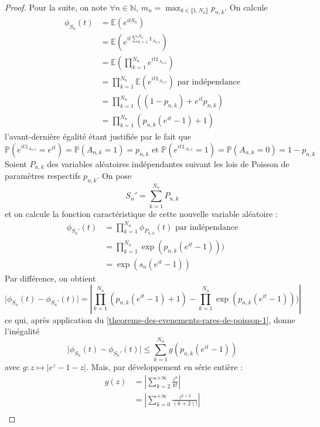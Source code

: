   \begin{proof}
    Pour la suite, on note $\forall n \in \mathbb{N}, \, m_n = \max_{k \in \llbracket 1, N_n \rrbracket} p_{n,k}$. On calcule
    \begin{align*}
      \phi_{S_n}(t) &= \mathbb{E} \left(e^{itS_n} \right) \\
      &= \mathbb{E} \left(e^{it \sum_{k=1}^{N_n} \mathbb{1}_{A_{n,k}}} \right) \\
      &= \mathbb{E} \left(\prod_{k=1}^{N_n} e^{it \mathbb{1}_{A_{n,k}}} \right) \\
      &= \prod_{k=1}^{N_n} \mathbb{E} \left(e^{it \mathbb{1}_{A_{n,k}}} \right) \text{ par indépendance} \\
      &= \prod_{k=1}^{N_n} \left( (1 - p_{n,k}) + e^{it} p_{n,k} \right) \\
      &= \prod_{k=1}^{N_n} \left( p_{n,k}(e^{it}-1) + 1 \right)
    \end{align*}
    l'avant-dernière égalité étant justifiée par le fait que
    \[ \mathbb{P}(e^{it \mathbb{1}_{A_{n,k}}} = e^{it}) = \mathbb{P}(A_{n,k} = 1) = p_{n,k} \text{ et } \mathbb{P}(e^{it \mathbb{1}_{A_{n,k}}} = 1) = \mathbb{P}(A_{n,k} = 0) = 1 - p_{n,k} \]
    Soient $P_{n,k}$ des variables aléatoires indépendantes suivant les lois de Poisson de paramètres respectifs $p_{n,k}$. On pose
    \[ S_n' = \sum_{k=1}^{N_n} P_{n,k} \]
    et on calcule la fonction caractéristique de cette nouvelle variable aléatoire :
    \begin{align*}
      \phi_{S_n'}(t) &= \prod_{k=1}^{N_n} \phi_{P_{n,k}} (t) \text{ par indépendance} \\
      &= \prod_{k=1}^{N_n} \exp ( p_{n,k}(e^{it} - 1 ))) \\
      &= \exp(s_n(e^{it} - 1))
    \end{align*}
    Par différence, on obtient
    \[ \vert \phi_{S_n}(t) - \phi_{S_n'}(t) \vert = \left| \prod_{k=1}^{N_n} \left( p_{n,k}(e^{it}-1) + 1 \right) - \prod_{k=1}^{N_n} \exp ( p_{n,k}(e^{it} - 1 ))) \right| \]
    ce qui, après application du \cref{theoreme-des-evenements-rares-de-poisson-1}, donne l'inégalité
    \[ \vert \phi_{S_n}(t) - \phi_{S_n'}(t) \vert \leq \sum_{k=1}^{N_n} g(p_{n,k}(e^{it}-1)) \]
    avec $g : z \mapsto \vert e^z - 1 - z \vert$. Mais, par développement en série entière :
    \begin{align*}
      g(z) &= \left\vert \sum_{k=2}^{+\infty} \frac{z^k}{k!} \right\vert \\
      &= \left\vert \sum_{k=0}^{+\infty} \frac{z^{k+2}}{(k+2)!} \right\vert  \\

\end{align*}
\end{proof}
